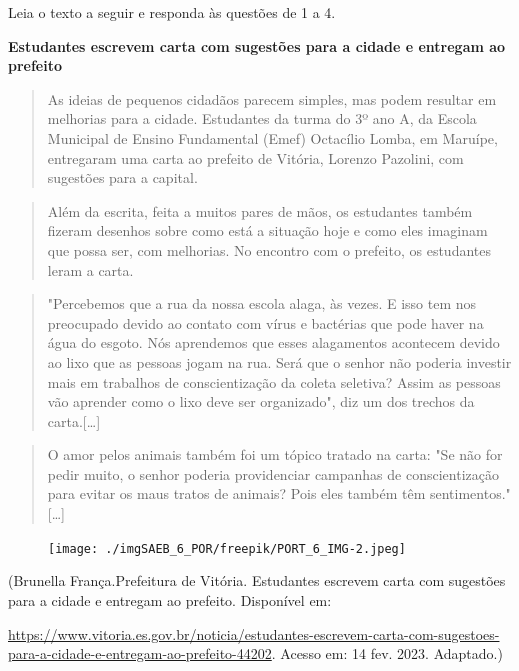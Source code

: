 
Leia o texto a seguir e responda às questões de 1 a 4.

\textbf{Estudantes escrevem carta com sugestões para a cidade e entregam
ao prefeito}

\begin{quote}
As ideias de pequenos cidadãos parecem simples, mas podem resultar em
melhorias para a cidade. Estudantes da turma do 3º ano A, da Escola
Municipal de Ensino Fundamental (Emef) Octacílio Lomba, em Maruípe,
entregaram uma carta ao prefeito de Vitória, Lorenzo Pazolini, com
sugestões para a capital.
\end{quote}

\begin{quote}
Além da escrita, feita a muitos pares de mãos, os estudantes também
fizeram desenhos sobre como está a situação hoje e como eles imaginam
que possa ser, com melhorias. No encontro com o prefeito, os estudantes
leram a carta.
\end{quote}

\begin{quote}
"Percebemos que a rua da nossa escola alaga, às vezes. E isso tem nos
preocupado devido ao contato com vírus e bactérias que pode haver na
água do esgoto. Nós aprendemos que esses alagamentos acontecem devido ao
lixo que as pessoas jogam na rua. Será que o senhor não poderia investir
mais em trabalhos de conscientização da coleta seletiva? Assim as
pessoas vão aprender como o lixo deve ser organizado", diz um dos
trechos da carta.{[}\ldots{}{]}
\end{quote}

\begin{quote}
O amor pelos animais também foi um tópico tratado na carta: "Se não for
pedir muito, o senhor poderia providenciar campanhas de conscientização
para evitar os maus tratos de animais? Pois eles também têm
sentimentos." {[}\ldots{}{]}
\end{quote}

\begin{figure}
\texttt{[image: ./imgSAEB\_6\_POR/freepik/PORT\_6\_IMG-2.jpeg]}
\end{figure}

(Brunella França.Prefeitura de Vitória. Estudantes escrevem carta com
sugestões para a cidade e entregam ao prefeito. Disponível em:

\url{https://www.vitoria.es.gov.br/noticia/estudantes-escrevem-carta-com-sugestoes-para-a-cidade-e-entregam-ao-prefeito-44202}.
Acesso em: 14 fev. 2023. Adaptado.)


